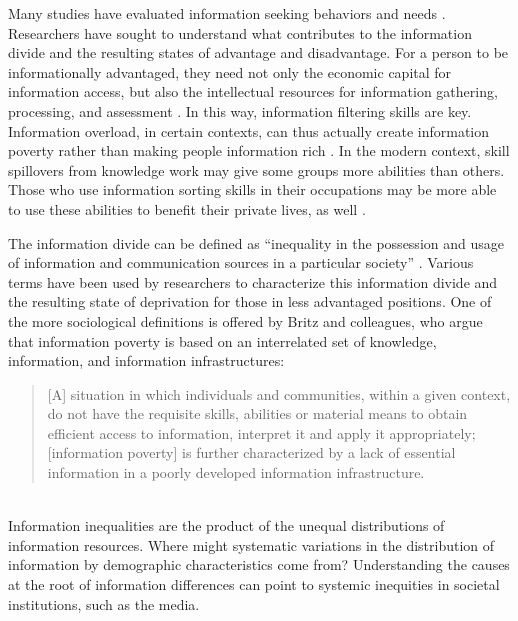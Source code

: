 \documentclass[11pt]{article}
\begin{document}
Many studies have evaluated information seeking behaviors and needs
\citep{Case2016}. Researchers have sought to understand what contributes to the information divide
and the resulting states of advantage and disadvantage. For a person to be
informationally advantaged, they need not only the economic capital for
information access, but also the intellectual resources for information
gathering, processing, and assessment \citep{Sweetland1993}. In this way,
information filtering skills are key. Information overload, in certain contexts,
can thus actually create information poverty rather than making people
information rich \citep{Yu2006}. In the modern context, skill spillovers from
knowledge work may give some groups more abilities than others. Those who use
information sorting skills in their occupations may be more able to use these
abilities to benefit their private lives, as well \citep{Xanthopoulou2012}.

The information divide can be defined as ``inequality in the possession and usage of
information and communication sources in a particular society''
\citep{VanDijk1997,VanDijk2000}. Various terms have been used by researchers to characterize this information
divide and the resulting state of deprivation for those in less advantaged
positions. One of the more sociological definitions is offered by Britz and
colleagues, who argue that information poverty is based on an interrelated
set of knowledge, information, and information infrastructures:

\noindent\begin{minipage}{\linewidth}
\begin{quote}
  [A] situation in which individuals and communities, within a given context, do
  not have the requisite skills, abilities or material means to obtain efficient
  access to information, interpret it and apply it appropriately; [information
  poverty] is further characterized by a lack of essential information in a
  poorly developed information infrastructure. \citep[194]{Britz2004}
\end{quote}
\end{minipage} \\

Information inequalities are the product of the unequal distributions of information resources.
Where might systematic variations in the distribution of
information by demographic characteristics come from? Understanding the causes
at the root of information differences can point to systemic inequities in societal institutions, such as the media.
\end{document}
